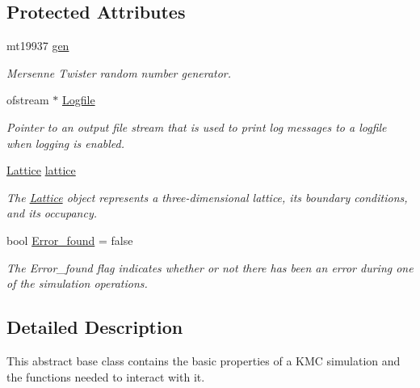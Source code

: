 \subsection*{Protected Attributes}
\begin{DoxyCompactItemize}
\item 
\mbox{\label{class_simulation_acdfae37bde7eb7e895d29e210c1f8bcc}} 
mt19937 \hyperlink{class_simulation_acdfae37bde7eb7e895d29e210c1f8bcc}{gen}
\begin{DoxyCompactList}\small\item\em Mersenne Twister random number generator. \end{DoxyCompactList}\item 
\mbox{\label{class_simulation_a7cdc6b74a1a2efb1e031bbaac603c6ad}} 
ofstream $\ast$ \hyperlink{class_simulation_a7cdc6b74a1a2efb1e031bbaac603c6ad}{Logfile}
\begin{DoxyCompactList}\small\item\em Pointer to an output file stream that is used to print log messages to a logfile when logging is enabled. \end{DoxyCompactList}\item 
\mbox{\label{class_simulation_afb2cf4feeb4d8292eeba8f9ef393c6a4}} 
\hyperlink{class_lattice}{Lattice} \hyperlink{class_simulation_afb2cf4feeb4d8292eeba8f9ef393c6a4}{lattice}
\begin{DoxyCompactList}\small\item\em The \hyperlink{class_lattice}{Lattice} object represents a three-\/dimensional lattice, its boundary conditions, and its occupancy. \end{DoxyCompactList}\item 
\mbox{\label{class_simulation_a7f4615a7898fb83d09be5e7fad92bb47}} 
bool \hyperlink{class_simulation_a7f4615a7898fb83d09be5e7fad92bb47}{Error\+\_\+found} = false
\begin{DoxyCompactList}\small\item\em The Error\+\_\+found flag indicates whether or not there has been an error during one of the simulation operations. \end{DoxyCompactList}\end{DoxyCompactItemize}


\subsection{Detailed Description}
This abstract base class contains the basic properties of a K\+MC simulation and the functions needed to interact with it. 

